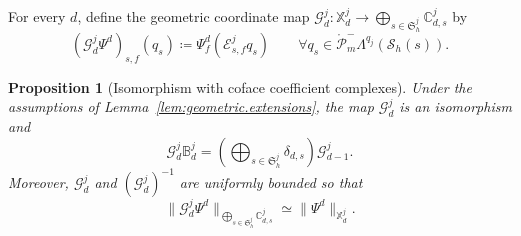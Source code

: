 \documentclass[a4paper,11pt]{article}
\newtheorem{proposition}[theorem]{Proposition}
\theoremstyle{definition}
\newcommand{\Sh}{\mathcal{S}_h}
\newcommand{\PLtrimz}[2]{\mathring{\mathcal P}_{#1}^{-}\Lambda^{#2}}
\begin{document}
For every $d$, define the geometric coordinate map $\mathcal G_d^j\colon \mathbb X_d^j \longrightarrow \bigoplus_{s\in\mathfrak S_h^j} \mathbb C_{d,s}^j$ by
\begin{equation}\label{eq:geometric.coordinate.definition}
\left(\mathcal G_d^j\Psi^d\right)_{s,f}(q_s)
\coloneqq
\Psi_f^d\left(\mathcal E_{s,f}^jq_s\right)
\qquad
\forall q_s\in\PLtrimz{m}{q_j}(\Sh(s)).
\end{equation}

\begin{proposition}[Isomorphism with coface coefficient complexes]
\label{prop:functional.cochain.isomorphism}
Under the assumptions of Lemma~\ref{lem:geometric.extensions}, the map $\mathcal G_d^j$ is an isomorphism and
\begin{equation}\label{eq:cochain.commutativity}
\mathcal G_d^j\mathbb B_d^j
=
\left(
\bigoplus_{s\in\mathfrak S_h^j}\delta_{d,s}
\right)
\mathcal G_{d-1}^j.
\end{equation}
Moreover, $\mathcal G_d^j$ and $(\mathcal G_d^j)^{-1}$ are uniformly bounded so that
\begin{equation}\label{eq:coordinate.norm.equivalence}
\|\mathcal G_d^j\Psi^d\|_{
\bigoplus_{s\in\mathfrak S_h^j}\mathbb C_{d,s}^j
}
\simeq
\|\Psi^d\|_{\mathbb X_d^j}.
\end{equation}
\end{proposition}
\end{document}
